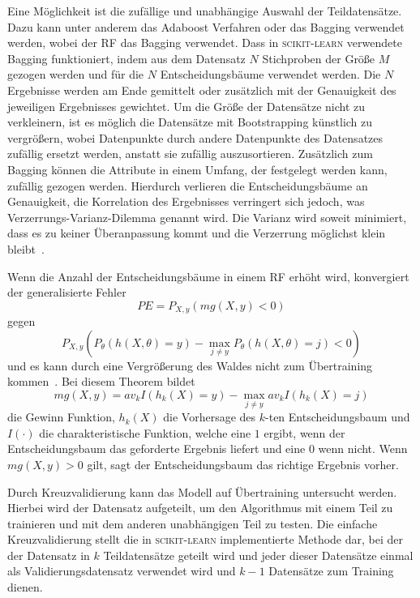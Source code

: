 Eine Möglichkeit ist die zufällige und unabhängige Auswahl der Teildatensätze.
Dazu kann unter anderem das Adaboost Verfahren oder das Bagging verwendet werden, wobei der RF das Bagging verwendet.
Dass in \textsc{scikit-learn} verwendete Bagging funktioniert, indem aus dem Datensatz $N$ Stichproben der Größe $M$ gezogen werden und für die $N$ Entscheidungsbäume verwendet werden.
Die $N$ Ergebnisse werden am Ende gemittelt oder zusätzlich mit der Genauigkeit des jeweiligen Ergebnisses gewichtet.
Um die Größe der Datensätze nicht zu verkleinern, ist es möglich die Datensätze mit Bootstrapping künstlich zu vergrößern, wobei Datenpunkte durch andere Datenpunkte
des Datensatzes zufällig ersetzt werden, anstatt sie zufällig auszusortieren.
Zusätzlich zum Bagging können die Attribute in einem Umfang, der festgelegt werden kann, zufällig gezogen werden.
Hierdurch verlieren die Entscheidungsbäume an Genauigkeit, die Korrelation des Ergebnisses verringert sich jedoch,
was Verzerrungs-Varianz-Dilemma genannt wird. Die Varianz wird soweit minimiert, dass es zu keiner Überanpassung kommt
und die Verzerrung möglichst klein bleibt~\cite[2]{Hyperparameter_RF}.

Wenn die Anzahl der Entscheidungsbäume in einem RF erhöht wird, konvergiert der generalisierte Fehler
\begin{equation}
  PE = P_{X,y}(mg(X,y)<0)
\end{equation}
gegen
\begin{equation}
  P_{X,y}(P_\theta(h(X,\theta)=y)-\max_{j\neq y}P_\theta(h(X,\theta)=j)<0)
\end{equation}
und es kann durch eine Vergrößerung des Waldes nicht zum Übertraining kommen~\cite[7]{RandomForests_Breiman}. Bei diesem Theorem bildet
\begin{equation}
  mg(X,y) = av_k I(h_k(X)=y) - \max_{j \neq y}av_k I(h_k(X)=j)
\end{equation}
die Gewinn Funktion, $h_k(X)$ die Vorhersage des $k$-ten Entscheidungsbaum und $I(\cdot)$ die charakteristische Funktion, welche eine $1$ ergibt, wenn der
Entscheidungsbaum das geforderte Ergebnis liefert und eine $0$ wenn nicht.
Wenn $mg(X,y) > 0$ gilt, sagt der Entscheidungsbaum das richtige Ergebnis vorher.



Durch Kreuzvalidierung kann das Modell auf Übertraining untersucht werden. Hierbei wird der Datensatz aufgeteilt, um
den Algorithmus mit einem Teil zu trainieren und mit dem anderen unabhängigen Teil zu testen.
Die einfache Kreuzvalidierung stellt die in \textsc{scikit-learn} implementierte Methode dar, bei der der Datensatz
in $k$ Teildatensätze geteilt wird und jeder dieser Datensätze einmal als Validierungsdatensatz
verwendet wird und $k-1$ Datensätze zum Training dienen.


